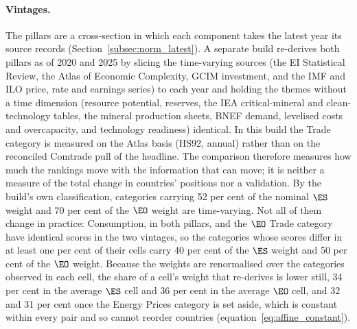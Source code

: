 \paragraph{Vintages.} The pillars are a cross-section in which each component takes the latest
year its source records (Section~\ref{subsec:norm_latest}). A separate build re-derives both
pillars as of 2020 and 2025 by slicing the time-varying sources (the EI Statistical Review, the
Atlas of Economic Complexity, GCIM investment, and the IMF and ILO price, rate and earnings
series) to each year and holding the themes without a time dimension (resource potential,
reserves, the IEA critical-mineral and clean-technology tables, the mineral production sheets,
BNEF demand, levelised costs and overcapacity, and technology readiness) identical. In this
build the Trade category is measured on the Atlas basis (HS92, annual) rather than on the
reconciled Comtrade pull of the headline. The comparison therefore measures how much the
rankings move with the information that can move; it is neither a measure of the total change
in countries' positions nor a validation. By the build's own classification, categories carrying
52 per cent of the nominal $\ES$ weight and 70 per cent of the $\EO$ weight are time-varying.
Not all of them change in practice: Consumption, in both pillars, and the $\EO$ Trade category
have identical scores in the two vintages, so the categories whose scores differ in at least one
per cent of their cells carry 40 per cent of the $\ES$ weight and 50 per cent of the $\EO$
weight. Because the weights are renormalised over the categories observed in each cell, the
share of a cell's weight that re-derives is lower still, 34 per cent in the average $\ES$ cell
and 36 per cent in the average $\EO$ cell, and 32 and 31 per cent once the Energy Prices
category is set aside, which is constant within every pair and so cannot reorder countries
(equation~\eqref{eq:affine_constant}).


